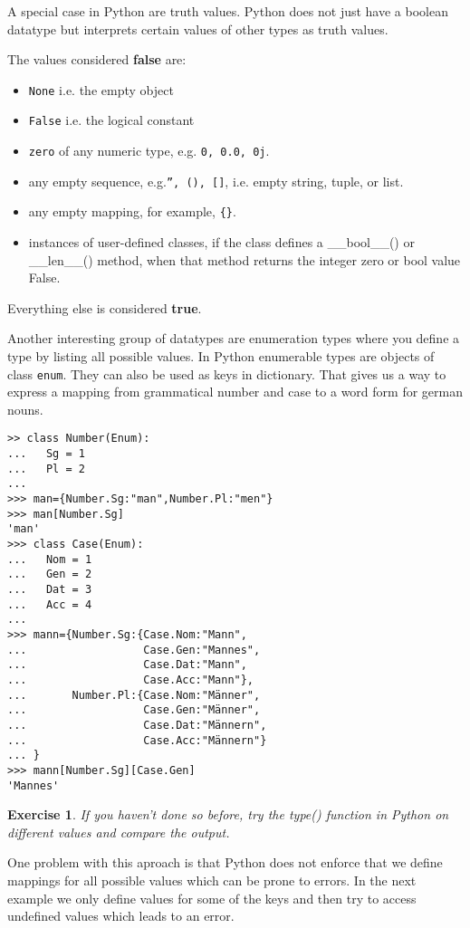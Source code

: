 \documentclass{scrartcl}
\newtheorem{exercise}{Exercise}
\begin{document}
A special case in Python are truth values. Python does not just have a boolean datatype but interprets certain values of other types as truth values.

The values considered \textbf{false} are: 
\begin{itemize}
\item \texttt{None} i.e. the empty object
\item \texttt{False} i.e. the logical constant
\item \texttt{zero} of any numeric type, e.g. \texttt{0, 0.0, 0j}.
\item any empty sequence, e.g.\texttt{'', (), []}, i.e. empty string, tuple, or list.
\item any empty mapping, for example, \texttt{\{\}}.
\item instances of user-defined classes, if the class defines a \_\_bool\_\_() or \_\_len\_\_() method, when that method returns the integer zero or bool value False.
\end{itemize}

Everything else is considered \textbf{true}.

Another interesting group of datatypes are enumeration types where you define a type by listing all possible values. In Python enumerable types are objects of class \texttt{enum}. They can also be used as keys in dictionary. That gives us a way to express a mapping from grammatical number and case to a word form for german nouns.

\begin{verbatim}
>> class Number(Enum):
...   Sg = 1
...   Pl = 2
... 
>>> man={Number.Sg:"man",Number.Pl:"men"}
>>> man[Number.Sg]
'man'
>>> class Case(Enum):
...   Nom = 1
...   Gen = 2
...   Dat = 3
...   Acc = 4
... 
>>> mann={Number.Sg:{Case.Nom:"Mann", 
...                  Case.Gen:"Mannes", 
...                  Case.Dat:"Mann", 
...                  Case.Acc:"Mann"},
...       Number.Pl:{Case.Nom:"Männer", 
...                  Case.Gen:"Männer", 
...                  Case.Dat:"Männern", 
...                  Case.Acc:"Männern"}
... }
>>> mann[Number.Sg][Case.Gen]
'Mannes'
\end{verbatim}

\begin{exercise}
  If you haven't done so before, try the type() function in Python on different values and compare the output. 
\end{exercise}

One problem with this aproach is that Python does not enforce that we define mappings for all possible values which can be prone to errors. In the next example we only define values for some of the keys and then try to access undefined values which leads to an error.
\end{document}
